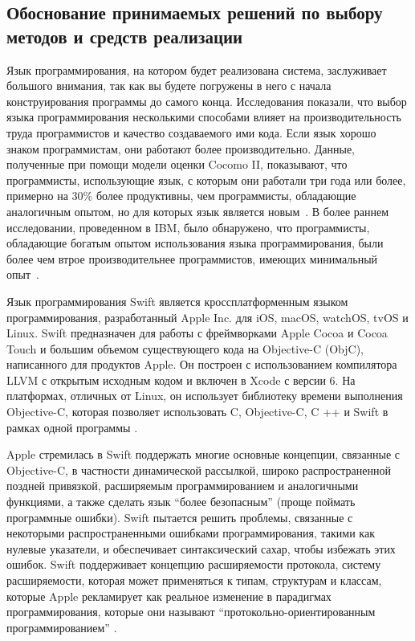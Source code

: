 \newpage
\subsection{Обоснование принимаемых решений по выбору методов и средств реализации}
\label{sec:develop:functionalModel}

Язык программирования, на котором будет реализована система, заслуживает большого внимания, так как вы будете погружены в него с начала конструирования программы до самого конца. Исследования показали, что выбор языка программирования несколькими способами влияет на производительность труда программистов и качество создаваемого ими кода. Если язык хорошо знаком программистам, они работают более производительно. Данные, полученные при помощи модели оценки Cocomo II, показывают, что программисты, использующие язык, с которым они работали три года или более, примерно на 30\% более продуктивны, чем программисты, обладающие аналогичным опытом, но для которых язык является новым~\cite{software_cost_estimation}. В более раннем исследовании, проведенном в IBM, было обнаружено, что программисты, обладающие богатым опытом использования языка программирования, были более чем втрое производительнее программистов, имеющих минимальный опыт~\cite{method_of_programming_measurement_and_estimation}.

Язык программирования Swift является кроссплатформенным языком программирования, разработанный Apple Inc. для iOS, macOS, watchOS, tvOS и Linux. Swift предназначен для работы с фреймворками Apple Cocoa и Cocoa Touch и большим объемом существующего кода на  Objective-C (ObjC), написанного для продуктов Apple. Он построен с использованием компилятора LLVM с открытым исходным кодом и включен в Xcode с версии 6. На платформах, отличных от Linux, он использует библиотеку времени выполнения Objective-C, которая позволяет использовать C, Objective-C, C ++ и Swift в рамках одной программы \cite{objc_doc}.

Apple стремилась в Swift поддержать многие основные концепции, связанные с Objective-C, в частности динамической рассылкой, широко распространенной поздней привязкой, расширяемым программированием и аналогичными функциями, а также сделать язык \enquote{более безопасным} (проще поймать программные ошибки). Swift пытается решить проблемы, связанные с некоторыми распространенными ошибками программирования, такими как нулевые указатели, и обеспечивает синтаксический сахар, чтобы избежать этих ошибок. Swift поддерживает концепцию расширяемости протокола, систему расширяемости, которая может применяться к типам, структурам и классам, которые Apple рекламирует как реальное изменение в парадигмах программирования, которые они называют \enquote{протокольно-ориентированным программированием} \cite{swift_doc}.

